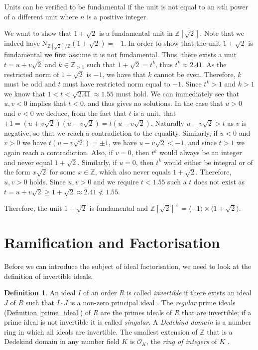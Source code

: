 \documentclass[openany, a4paper, 10pt]{book}
\theoremstyle{plain}
\theoremstyle{plain}
\theoremstyle{plain}
\theoremstyle{definition}
\newtheorem{definition}[theorem]{Definition}
\theoremstyle{plain}
\theoremstyle{definition}
\theoremstyle{remark}
\newcommand{\defref}[1]{\hyperref[#1]{Definition \ref{#1}}}
\begin{document}
Units can be verified to be fundamental if the unit is not equal to an $n$th power of a different unit where $n$ is a positive integer.
\begin{examplebox}
    We want to show that $1+\sqrt{2}$ is a fundamental unit in $\mathbb Z[\sqrt{2}]$.
    Note that we indeed have $\mathrm{N}_{\mathbb Z[\sqrt{2}]/\mathbb Z}(1+\sqrt{2}) = -1$.
    In order to show that the unit $1+\sqrt{2}$ is fundamental we first assume it is not fundamental.
    Thus, there exists a unit $t= u+v\sqrt{2}$ and $k \in \mathbb Z_{> 1}$ such that $1+\sqrt{2} = t^k$, thus $t^k \approx 2.41$.
    As the restricted norm of $1+\sqrt{2}$ is $-1$, we have that $k$ cannot be even.
    Therefore, $k$ must be odd and $t$ must have restricted norm equal to $-1$.
    Since $t^k > 1$ and $k > 1$ we know that $1 < t < \sqrt{2.41} \approx 1.55$ must hold.
    We can immediately see that $u,v<0$ implies that $t < 0$, and thus gives no solutions.
    In the case that $u>0$ and $v<0$ we deduce, from the fact that $t$ is a unit, that $\pm 1=(u+v\sqrt{2})(u-v\sqrt{2})=t(u-v\sqrt{2})$.
    Naturally $u-v\sqrt{2} > t$ as $v$ is negative, so that we reach a contradiction to the equality.
    Similarly, if $u<0$ and $v>0$ we have $t(u-v\sqrt{2})=\pm 1$, we have $u-v\sqrt{2}<-1$, and since $t > 1$ we again reach a contradiction.
    Also, if $v=0$, then $t^k$ would always be an integer and never equal $1+\sqrt{2}$.
    Similarly, if $u=0$, then $t^k$ would either be integral or of the form $x\sqrt{2}$ for some $x\in \mathbb Z$, which also never equals $1+\sqrt{2}$.
    Therefore, $u,v > 0$ holds.
    Since $u,v>0$ and we require $t < 1.55$ such a $t$ does not exist as $t = u+v\sqrt{2} \geq 1+\sqrt{2} \approx 2.41 \nless 1.55$.

    Therefore, the unit $1+\sqrt{2}$ is fundamental and $\mathbb Z[\sqrt{2}]^\times =\langle -1 \rangle \times \langle 1+\sqrt{2} \rangle$.
\end{examplebox}

\section{Ramification and Factorisation}\label{factorisation}
Before we can introduce the subject of ideal factorisation, we need to look at the definition of invertible ideals.
\begin{definition}
    An ideal $I$ of an order $R$ is called \textit{invertible} if there exists an ideal $J$ of $R$ such that $I\cdot J$ is a non-zero principal ideal \cite[p.~17]{ANT_dictaat}.
    The \textit{regular} prime ideals (\defref{prime_ideal}) of $R$ are the primes ideals of $R$ that are invertible;
    if a prime ideal is not invertible it is called \textit{singular}.
    A \textit{Dedekind domain} is a number ring in which all ideals are invertible.
    The smallest extension of $\mathbb Z$ that is a Dedekind domain in any number field $K$ is $\mathcal O_K$, the \textit{ring of integers} of $K$ \cite[Theorem~3.20]{ANT_dictaat}.
\end{definition}
\end{document}
